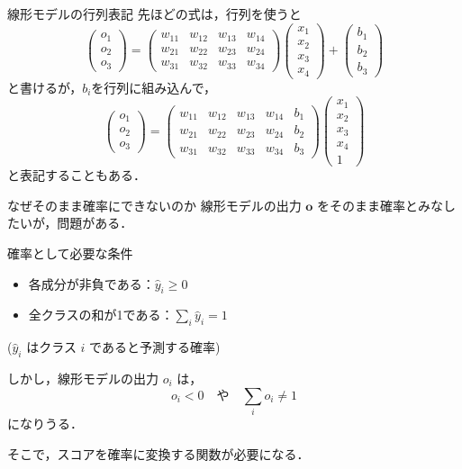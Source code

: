 \documentclass[dvipdfmx,uplatex,11pt]{beamer}
\begin{document}
\begin{frame}{線形モデルの行列表記}
先ほどの式は，行列を使うと
\[
\begin{pmatrix}
o_1\\
o_2\\
o_3
\end{pmatrix}
=
\begin{pmatrix}
w_{11} & w_{12} & w_{13} & w_{14}\\
w_{21} & w_{22} & w_{23} & w_{24}\\
w_{31} & w_{32} & w_{33} & w_{34}
\end{pmatrix}
\begin{pmatrix}
x_1\\
x_2\\
x_3\\
x_4
\end{pmatrix}
+
\begin{pmatrix}b_1\\
b_2\\
b_3
\end{pmatrix}
\]
と書けるが，$b_i$を行列に組み込んで，
\[
\begin{pmatrix}
o_1\\
o_2\\
o_3
\end{pmatrix}
=
\begin{pmatrix}w_{11} & w_{12} & w_{13} & w_{14} & b_1\\
w_{21} & w_{22} & w_{23} & w_{24} & b_2\\
w_{31} & w_{32} & w_{33} & w_{34} & b_3
\end{pmatrix}
\begin{pmatrix}x_1\\
x_2\\
x_3\\
x_4\\
1
\end{pmatrix}
\]と表記することもある．
\end{frame}

\begin{frame}{なぜそのまま確率にできないのか}
線形モデルの出力 $\mathbf{o}$ をそのまま確率とみなしたいが，問題がある．

\begin{alertblock}{確率として必要な条件}
\begin{itemize}
  \item 各成分が非負である：$\hat{y}_i \geq 0$
  \item 全クラスの和が1である：$\sum_i \hat{y}_i = 1$
\end{itemize}
($\hat{y}_i$ はクラス $i$ であると予測する確率)
\end{alertblock}

\vspace{1em}
しかし，線形モデルの出力 $o_i$ は，
\[
  o_i < 0
  \quad \text{や} \quad
  \sum_i o_i \neq 1
\]
になりうる．

\vspace{1em}
\centering
そこで，スコアを確率に変換する関数が必要になる．
\end{frame}
\end{document}
